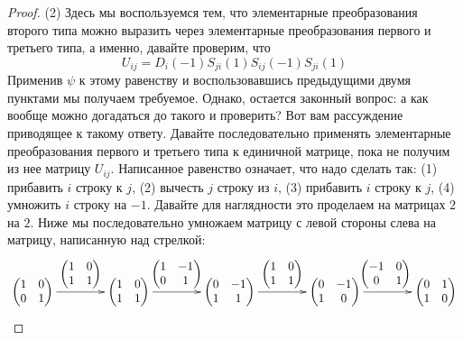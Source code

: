 \begin{proof}
(2) Здесь мы воспользуемся тем, что элементарные преобразования второго типа можно выразить через элементарные преобразования первого и третьего типа, а именно, давайте проверим, что 
\[
U_{ij} = D_i(-1)S_{ji}(1)S_{ij}(-1)S_{ji}(1)
\]
Применив $\psi$ к этому равенству и воспользовавшись предыдущими двумя пунктами мы получаем требуемое.
Однако, остается законный вопрос: а как вообще можно догадаться до такого и проверить?
Вот вам рассуждение приводящее к такому ответу.
Давайте последовательно применять элементарные преобразования первого и третьего типа к единичной матрице, пока не получим из нее матрицу $U_{ij}$.
Написанное равенство означает, что надо сделать так: (1) прибавить $i$ строку к $j$, (2) вычесть $j$ строку из $i$, (3) прибавить $i$ строку к $j$, (4) умножить $i$ строку на $-1$.
Давайте для наглядности это проделаем на матрицах $2$ на $2$.
Ниже мы последовательно умножаем матрицу с левой стороны слева на матрицу, написанную над стрелкой:
\[
\xymatrix@R=10pt@C=40pt{
 	{
 	\begin{pmatrix}
	{1}&{0}\\
	{0}&{1}\\
	\end{pmatrix}
	}\ar[r]^-{
	\begin{pmatrix}
	{1}&{0}\\{1}&{1}\\
	\end{pmatrix}
	}&{
 	\begin{pmatrix}
	{1}&{0}\\
	{1}&{1}\\
	\end{pmatrix}
	}\ar[r]^-{
 	\begin{pmatrix}
	{1}&{-1}\\
	{0}&{1}\\
	\end{pmatrix}
	}&{
 	\begin{pmatrix}
	{0}&{-1}\\
	{1}&{1}\\
	\end{pmatrix}
	}\ar[r]^{
 	\begin{pmatrix}
	{1}&{0}\\
	{1}&{1}\\
	\end{pmatrix}
	}&{
 	\begin{pmatrix}
	{0}&{-1}\\
	{1}&{0}\\
	\end{pmatrix}
	}\ar[r]^{
 	\begin{pmatrix}
	{-1}&{0}\\
	{0}&{1}\\
	\end{pmatrix}
	}&{
 	\begin{pmatrix}
	{0}&{1}\\
	{1}&{0}\\
	\end{pmatrix}
	}
}
\]
\end{proof}


